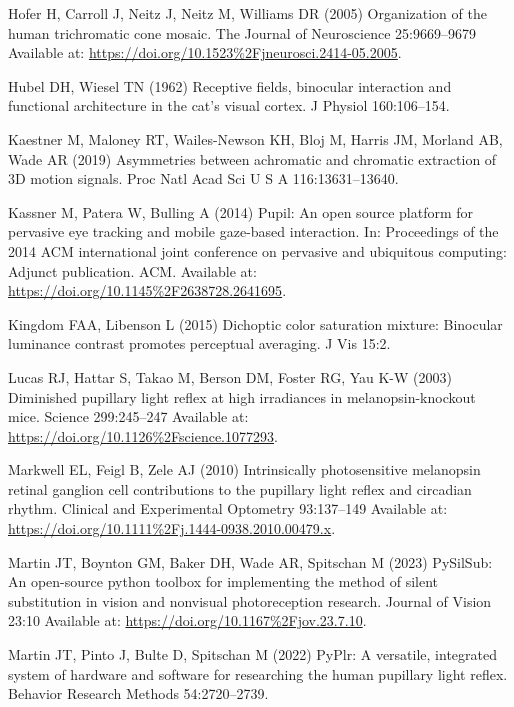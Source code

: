 \documentclass[
]{article}
\begin{document}
\leavevmode\hypertarget{ref-Hofer2005}{}%
Hofer H, Carroll J, Neitz J, Neitz M, Williams DR (2005) Organization of the human trichromatic cone mosaic. The Journal of Neuroscience 25:9669--9679 Available at: \url{https://doi.org/10.1523\%2Fjneurosci.2414-05.2005}.

\leavevmode\hypertarget{ref-Hubel1962}{}%
Hubel DH, Wiesel TN (1962) Receptive fields, binocular interaction and functional architecture in the cat's visual cortex. J Physiol 160:106--154.

\leavevmode\hypertarget{ref-Kaestner2019}{}%
Kaestner M, Maloney RT, Wailes-Newson KH, Bloj M, Harris JM, Morland AB, Wade AR (2019) Asymmetries between achromatic and chromatic extraction of 3D motion signals. Proc Natl Acad Sci U S A 116:13631--13640.

\leavevmode\hypertarget{ref-Kassner2014}{}%
Kassner M, Patera W, Bulling A (2014) Pupil: An open source platform for pervasive eye tracking and mobile gaze-based interaction. In: Proceedings of the 2014 ACM international joint conference on pervasive and ubiquitous computing: Adjunct publication. ACM. Available at: \url{https://doi.org/10.1145\%2F2638728.2641695}.

\leavevmode\hypertarget{ref-Kingdom2015}{}%
Kingdom FAA, Libenson L (2015) Dichoptic color saturation mixture: Binocular luminance contrast promotes perceptual averaging. J Vis 15:2.

\leavevmode\hypertarget{ref-Lucas2003}{}%
Lucas RJ, Hattar S, Takao M, Berson DM, Foster RG, Yau K-W (2003) Diminished pupillary light reflex at high irradiances in melanopsin-knockout mice. Science 299:245--247 Available at: \url{https://doi.org/10.1126\%2Fscience.1077293}.

\leavevmode\hypertarget{ref-Markwell2010}{}%
Markwell EL, Feigl B, Zele AJ (2010) Intrinsically photosensitive melanopsin retinal ganglion cell contributions to the pupillary light reflex and circadian rhythm. Clinical and Experimental Optometry 93:137--149 Available at: \url{https://doi.org/10.1111\%2Fj.1444-0938.2010.00479.x}.

\leavevmode\hypertarget{ref-Martin2023}{}%
Martin JT, Boynton GM, Baker DH, Wade AR, Spitschan M (2023) PySilSub: An open-source python toolbox for implementing the method of silent substitution in vision and nonvisual photoreception research. Journal of Vision 23:10 Available at: \url{https://doi.org/10.1167\%2Fjov.23.7.10}.

\leavevmode\hypertarget{ref-Martin2022}{}%
Martin JT, Pinto J, Bulte D, Spitschan M (2022) PyPlr: A versatile, integrated system of hardware and software for researching the human pupillary light reflex. Behavior Research Methods 54:2720--2739.
\end{document}
